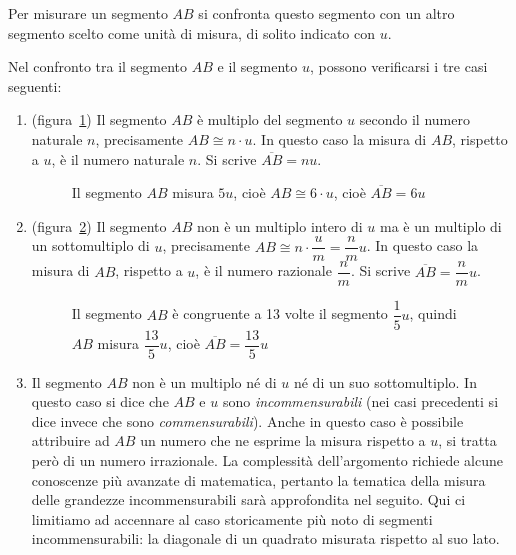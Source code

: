 Per misurare un segmento \(AB\) si confronta questo segmento con un 
altro segmento scelto come unità di misura, di solito indicato con 
\(u\).

Nel confronto tra il segmento \(AB\) e il segmento \(u\), possono 
verificarsi i tre casi seguenti:
\begin{enumerate}
\item (figura~\ref{fig:mis_segm1}) Il segmento \(AB\) è multiplo del 
segmento \(u\) secondo il numero naturale \(n\), precisamente \(AB\cong 
n\cdot u\). In questo caso la misura di \(AB\), rispetto a \(u\), è il 
numero naturale \(n\). Si scrive \(\overline{AB} = nu\).


\begin{inaccessibleblock}
 \begin{figure}[htb]
\centering
\caption{Il segmento \(AB\) misura \(5u\), cioè \(AB\cong 6\cdot u\), cioè 
\(\overline{AB}=6u\)}\label{fig:mis_segm1}
\end{figure}
\end{inaccessibleblock}

\item (figura~\ref{fig:mis_segm2}) Il segmento \(AB\) non è un multiplo 
intero di \(u\) ma è un multiplo di un sottomultiplo di \(u\), 
precisamente \(AB\cong n\cdot \dfrac{u}{m}=\dfrac{n}{m}u\). In questo 
caso la misura di \(AB\), rispetto a \(u\), è il numero razionale 
\(\dfrac{n}{m}\). Si scrive \(\overline{AB} = \dfrac{n}{m}u\).


\begin{inaccessibleblock}
 \begin{figure}[htb]
\centering
\caption{Il segmento \(AB\) è congruente a 13 volte il segmento 
\(\dfrac{1}{5}u\), quindi \(AB\) misura \(\dfrac{13}{5}u\), cioè 
\(\overline{AB}=\dfrac{13}{5}u\)}\label{fig:mis_segm2}
\end{figure}
\end{inaccessibleblock}

\item Il segmento \(AB\) non è un multiplo né di \(u\) né di un suo 
sottomultiplo. In questo caso si dice che \(AB\) e \(u\) sono 
\emph{incommensurabili} (nei casi precedenti si dice invece che sono 
\emph{commensurabili}). Anche in questo caso è possibile attribuire 
ad \(AB\) un numero che ne esprime la misura rispetto a \(u\), si tratta 
però di un numero irrazionale. La complessità dell'argomento richiede 
alcune conoscenze più avanzate di matematica, pertanto la tematica 
della misura delle grandezze incommensurabili sarà approfondita nel 
seguito. Qui ci limitiamo ad accennare al caso storicamente più noto 
di segmenti incommensurabili: la diagonale di un quadrato misurata 
rispetto al suo lato.



\end{enumerate}
